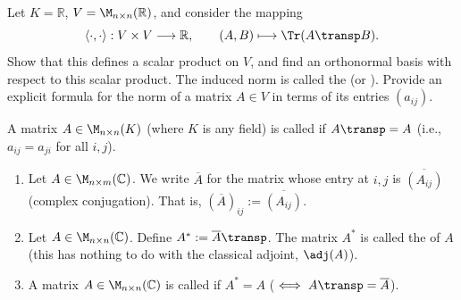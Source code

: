 \begin{exercise}
  \label{exc:frobenius_hilbert_schmidt_inner_product}
  Let $K = \mathbb{R}$, $V = \M_{n \times n}(\mathbb{R})$, and consider the mapping
  \[
  \langle \cdot, \cdot \rangle : V \times V \longrightarrow \mathbb{R}, \qquad (A, B) \longmapsto \Tr(A\transp B).
  \]
  Show that this defines a scalar product on $V$, and find an orthonormal basis with respect to this scalar product. The induced norm is called the  (or ). Provide an explicit formula for the norm of a matrix $A \in V$ in terms of its entries $(a_{ij})$.
\end{exercise}

\begin{definition}
\label{def:symmetric_matrix}
    A matrix $A \in \M_{n \times n}(K)$ (where $K$ is any field) is called  if $A\transp = A$ (i.e., $a_{ij} = a_{ji}$ for all $i,j$).
\end{definition}

\begin{definition}
\label{def:adjoint_hermitian_matrices}
    \begin{enumerate}[label=\textbf{(\alph*)}]
        \item Let $A \in \M_{n \times m}(\mathbb{C})$. We write $\overline{A}$ for the matrix whose entry at $i,j$ is $\overline{(A_{ij})}$ (complex conjugation). That is, $(\overline{A})_{ij} := \overline{(A_{ij})}$.
        \item Let $A \in \M_{n \times n}(\mathbb{C})$. Define $A^* := \overline{A}\transp$. The matrix $A^*$ is called the  of $A$ (this has nothing to do with the classical adjoint, $\adj(A)$).
        \item A matrix $A \in \M_{n \times n}(\mathbb{C})$ is called  if $A^* = A$ ($\iff A\transp = \overline{A}$).
    \end{enumerate}
\end{definition}

